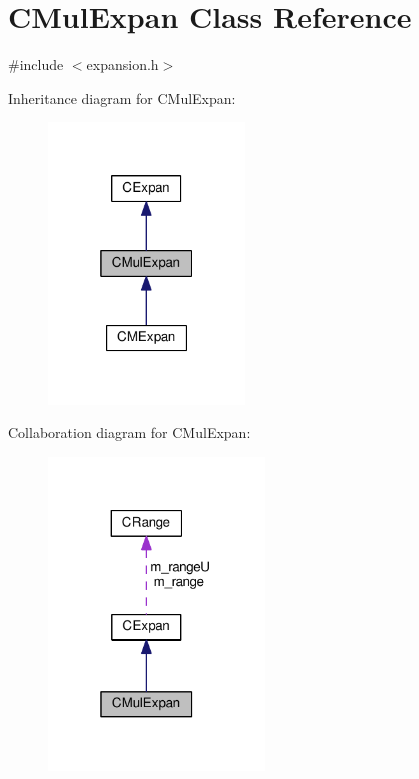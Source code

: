 \hypertarget{classCMulExpan}{\section{C\-Mul\-Expan Class Reference}
\label{classCMulExpan}
}


{\ttfamily \#include $<$expansion.\-h$>$}



Inheritance diagram for C\-Mul\-Expan\-:\nopagebreak
\begin{figure}[H]
\begin{center}
\leavevmode
\includegraphics[width=148pt]{classCMulExpan__inherit__graph}
\end{center}
\end{figure}


Collaboration diagram for C\-Mul\-Expan\-:\nopagebreak
\begin{figure}[H]
\begin{center}
\leavevmode
\includegraphics[width=163pt]{classCMulExpan__coll__graph}
\end{center}
\end{figure}
